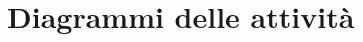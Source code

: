 \documentclass[../SpecificaTecnica.tex]{subfiles}
\begin{document}
\section{Diagrammi delle attività}
\end{document}
